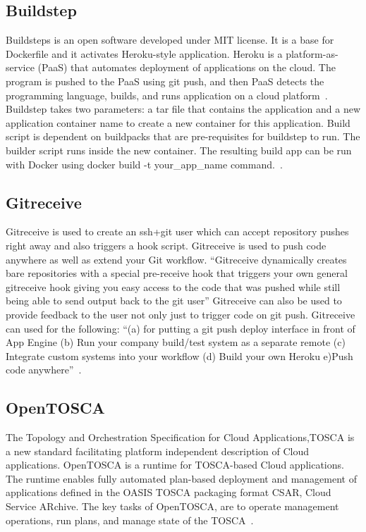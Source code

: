 {     \pv
     
\subsection{Buildstep}
     
Buildsteps is an open software developed under MIT license.  It is a
base for Dockerfile and it activates Heroku-style application. Heroku
is a platform-as-service (PaaS) that automates deployment of
applications on the cloud. The program is pushed to the PaaS using git
push, and then PaaS detects the programming language, builds, and runs
application on a cloud platform~\cite{plassnig15}.  Buildstep takes
two parameters: a tar file that contains the application and a new
application container name to create a new container for this
application. Build script is dependent on buildpacks that are
pre-requisites for buildstep to run. The builder script runs inside
the new container.  The resulting build app can be run with Docker
using docker build -t your\_app\_name
command.~\cite{github-buildstep}.

\subsection{Gitreceive}

Gitreceive is used to create an ssh+git user which can accept
repository pushes right away and also triggers a hook
script. Gitreceive is used to push code anywhere as well as extend
your Git workflow. ``Gitreceive dynamically creates bare repositories
with a special pre-receive hook that triggers your own general
gitreceive hook giving you easy access to the code that was pushed
while still being able to send output back to the git user''
Gitreceive can also be used to provide feedback to the user not only
just to trigger code on git push.  Gitreceive can used for the
following: ``(a) for putting a git push deploy interface in front of
App Engine (b) Run your company build/test system as a separate remote
(c) Integrate custom systems into your workflow (d) Build your own
Heroku e)Push code anywhere''~\cite{lindsay2016}.
     
\subsection{OpenTOSCA}

The Topology and Orchestration Specification for Cloud
Applications,TOSCA is a new standard facilitating platform independent
description of Cloud applications. OpenTOSCA is a runtime for
TOSCA-based Cloud applications. The runtime enables fully automated
plan-based deployment and management of applications defined in the
OASIS TOSCA packaging format CSAR, Cloud Service ARchive.  The key
tasks of OpenTOSCA, are to operate management operations, run plans,
and manage state of the TOSCA~\cite{openTOSCA-paper}.
     
}

